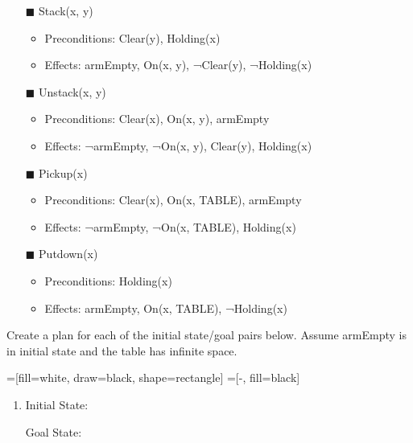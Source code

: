 \documentclass[11pt]{article}
\begin{document}
\begin{flushleft}
\begin{itemize}
    \item[$\blacksquare$] Stack(x, y)
        \begin{itemize}
            \item Preconditions: Clear(y), Holding(x)
            \item Effects: armEmpty, On(x, y), ¬Clear(y), ¬Holding(x)
        \end{itemize}
    \item[$\blacksquare$] Unstack(x, y)
        \begin{itemize}
            \item Preconditions: Clear(x), On(x, y), armEmpty
            \item Effects: ¬armEmpty, ¬On(x, y), Clear(y), Holding(x)
        \end{itemize}
    \item[$\blacksquare$] Pickup(x)
        \begin{itemize}
            \item Preconditions: Clear(x), On(x, TABLE), armEmpty
            \item Effects: ¬armEmpty, ¬On(x, TABLE), Holding(x)
        \end{itemize}
    \item[$\blacksquare$] Putdown(x)
        \begin{itemize}
            \item Preconditions: Holding(x)
            \item Effects: armEmpty, On(x, TABLE), ¬Holding(x)
        \end{itemize}
\end{itemize}

Create a plan for each of the initial state/goal pairs below.
Assume armEmpty is in initial state and the table has infinite space.

=[fill=white, draw=black, shape=rectangle]
=[-, fill=black]

\begin{enumerate}[label=(\alph*)]
\itemsep1em
    \item 
        \hspace{2em}
        Initial State:
        \hspace{2em}
        Goal State:


\end{enumerate}
\end{flushleft}
\end{document}
